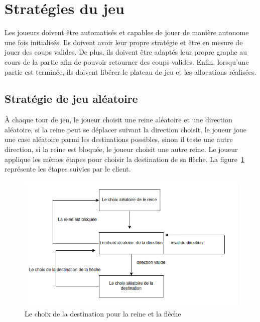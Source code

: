 \documentclass[11pt]{article}
\begin{document}
    \section{Stratégies du jeu}
     Les joueurs doivent être automatisés et capables de jouer de manière autonome une fois initialisés. Ils doivent avoir leur propre stratégie et être en mesure de jouer des coups valides. De plus, ils doivent être adaptés leur propre graphe au cours de la partie afin de pouvoir retourner des coups valides. Enfin, lorsqu'une partie est terminée, ils doivent libérer le plateau de jeu et les allocations réalisées.
        \subsection{Stratégie de jeu aléatoire}
        À chaque tour de jeu, le joueur choisit une reine aléatoire et une direction aléatoire, si la reine peut se déplacer suivant la direction choisit, le joueur joue une case aléatoire parmi les destinations possibles, sinon il teste une autre direction, si la reine est bloquée, le joueur choisit une autre reine. Le joueur applique les mêmes étapes pour choisir la destination de sa flèche. La figure~\ref{fig:joueur_aleatoire} représente les étapes suivies par le client.
         \begin{figure}[h]
                \centering
                \includegraphics[scale=0.7]{jouer_aleato.png}
                \caption{Le choix de la destination pour la reine et la flèche }
                \label{fig:joueur_aleatoire}
            \end{figure}
            \newpage
\end{document}
